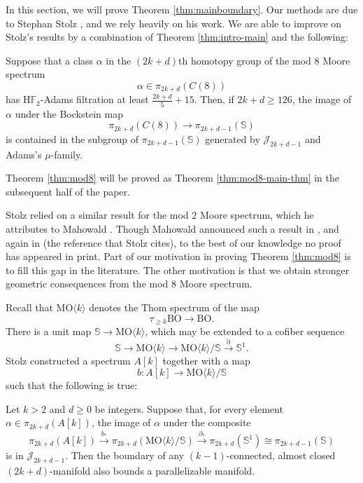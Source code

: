 In this section, we will prove Theorem \ref{thm:mainboundary}.  Our methods are due to Stephan Stolz \cite{StolzBook}, and we rely heavily on his work.  We are able to improve on Stolz's results by a combination of Theorem \ref{thm:intro-main} and the following:

\begin{thm} \label{thm:mod8}
Suppose that a class $\alpha$ in the $(2k+d)$th homotopy group of the mod $8$ Moore spectrum
    $$\alpha \in \pi_{2k+d}(C(8))$$
has $\mathrm{H}\mathbb{F}_2$-Adams filtration at least $\frac{2k+d}{5}+15$.  Then, if $2k+d \ge 126$, the image of $\alpha$ under the Bockstein map
$$\pi_{2k+d}(C(8)) \to \pi_{2k+d-1}(\mathbb{S})$$
is contained in the subgroup of $\pi_{2k+d-1}(\mathbb{S})$ generated by $\mathcal{J}_{2k+d-1}$ and Adams's $\mu$-family.
\end{thm}

Theorem \ref{thm:mod8} will be proved as Theorem \ref{thm:mod8-main-thm} in the subsequent half of the paper.

\begin{rmk}
    Stolz relied on a similar result for the mod $2$ Moore spectrum, which he attributes to Mahowald \cite[Satz 12.9]{StolzBook}.  Though Mahowald announced such a result in \cite{MahBull}, and again in \cite{MahTokyo} (the reference that Stolz cites), to the best of our knowledge no proof has appeared in print.  Part of our motivation in proving Theorem \ref{thm:mod8} is to fill this gap in the literature. The other motivation is that we obtain stronger geometric consequences from the mod $8$ Moore spectrum.
\end{rmk}

Recall that $\mathrm{MO} \langle k \rangle$ denotes the Thom spectrum of the map
$$\tau_{\ge k} \mathrm{BO} \to \mathrm{BO}.$$
There is a unit map $\mathbb{S} \to \mathrm{MO} \langle k \rangle$, which may be extended to a cofiber sequence
$$\mathbb{S} \to \mathrm{MO} \langle k \rangle \to \mathrm{MO} \langle k \rangle / \mathbb{S} \stackrel{\partial}{\to} \mathbb{S}^1.$$
Stolz constructed \cite[Satz 3.1]{StolzBook} a spectrum $A[k]$ together with a map $$b:A[k] \to \mathrm{MO} \langle k \rangle / \mathbb{S}$$ such that the following is true:

\begin{thm}
Let $k>2$ and $d \ge 0$ be integers.  Suppose that, for every element $\alpha \in \pi_{2k+d}(A[k])$, the image of $\alpha$ under the composite
$$\pi_{2k+d}(A[k]) \stackrel{b_*}{\longrightarrow} \pi_{2k+d} \left( \mathrm{MO} \langle k \rangle / \mathbb{S} \right) \stackrel{\partial_*}{\longrightarrow} \pi_{2k+d}(\mathbb{S}^1) \cong \pi_{2k+d-1}(\mathbb{S})$$
is in $\mathcal{J}_{2k+d-1}$.  Then the boundary of any $(k-1)$-connected, almost closed $(2k+d)$-manifold also bounds a parallelizable manifold.
\end{thm}

